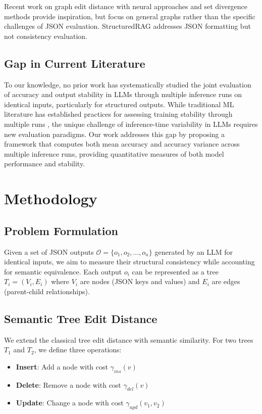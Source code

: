 \documentclass[letterpaper]{article} %
\begin{document}
Recent work on graph edit distance with neural approaches \cite{Cheng2023} and set divergence methods \cite{Wang2024} provide inspiration, but focus on general graphs rather than the specific challenges of JSON evaluation. StructuredRAG \cite{Chen2024} addresses JSON formatting but not consistency evaluation.

\subsection{Gap in Current Literature}

To our knowledge, no prior work has systematically studied the joint evaluation of accuracy and output stability in LLMs through multiple inference runs on identical inputs, particularly for structured outputs. While traditional ML literature has established practices for assessing training stability through multiple runs \cite{Bouthillier2021}, the unique challenge of inference-time variability in LLMs requires new evaluation paradigms. Our work addresses this gap by proposing a framework that computes both mean accuracy and accuracy variance across multiple inference runs, providing quantitative measures of both model performance and stability.

\section{Methodology}

\subsection{Problem Formulation}

Given a set of JSON outputs $\mathcal{O} = \{o_1, o_2, ..., o_n\}$ generated by an LLM for identical inputs, we aim to measure their structural consistency while accounting for semantic equivalence. Each output $o_i$ can be represented as a tree $T_i = (V_i, E_i)$ where $V_i$ are nodes (JSON keys and values) and $E_i$ are edges (parent-child relationships).

\subsection{Semantic Tree Edit Distance}

We extend the classical tree edit distance with semantic similarity. For two trees $T_1$ and $T_2$, we define three operations:

\begin{itemize}
\item \textbf{Insert}: Add a node with cost $\gamma_{ins}(v)$
\item \textbf{Delete}: Remove a node with cost $\gamma_{del}(v)$
\item \textbf{Update}: Change a node with cost $\gamma_{upd}(v_1, v_2)$
\end{itemize}
\end{document}
